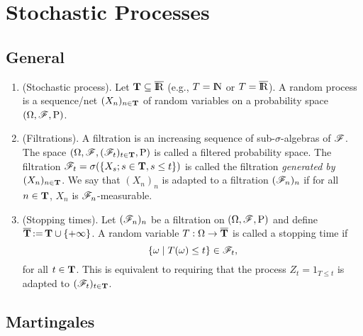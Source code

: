 \documentclass[a4paper,10pt]{article}
\begin{document}
\section{Stochastic Processes}
\subsection{General}
\begin{enumerate}
 \item (Stochastic process). Let $\T \subseteq \barre$ (e.g., $T=\N$ or $T=\barre$). A random process is 
       a sequence/net $(X_n)_{n\in \mathbf{T}}$ of random variables on a probability space $(\Omega,\mathscr{F},\mathrm{P})$.
       
 \item (Filtrations). A filtration is an increasing sequence of sub-$\sigma$-algebras of $\mathscr{F}$. The space 
       $(\Omega, \mathscr{F}, (\mathscr{F}_t)_{t\in \mathbf{T}}, \mathrm{P})$ is called a filtered probability space. The filtration 
       $\mathscr{F}_t = \sigma(\{X_s; s\in \mathbf{T}, s\leq t\})$ is called the filtration \textit{generated by $(X_n)_{n\in \mathbf{T}}$}.
       We say that $(X_n)_n$ is adapted to a filtration $(\mathscr{F}_n)_n$ if for all $n\in \mathbf{T}$, $X_n$ is $\mathscr{F}_n$-measurable.
       
 \item (Stopping times). Let $(\mathscr{F}_n)_n$ be a filtration on $(\Omega,\mathscr{F},\mathrm{P})$ and define $\overline{\mathbf{T}} {}\mathop{\mathrel{:}=}{} \mathbf{T} \cup \{+\infty\}$.
       A random variable $T: \Omega \to \overline{\mathbf{T}}$ is called a stopping time if
       \[
        \{\omega {}\mid{} T(\omega) \leq t\} \in \mathscr{F}_t,
       \]
      for all $t\in \mathbf{T}$. This is equivalent to requiring that the process $Z_t = 1_{T \leq t}$ is adapted to $(\mathscr{F}_t)_{t\in \mathbf{T}}$.
\end{enumerate}

\subsection{Martingales}
\end{document}
